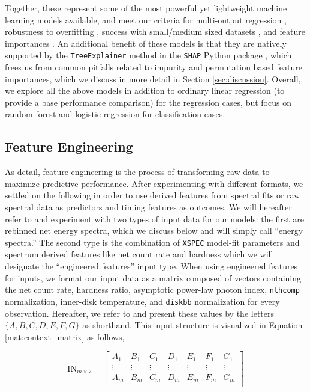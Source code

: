\documentclass[fleqn,usenatbib,twocolumn]{mnras}%
\begin{document}
Together, these represent some of the most powerful yet lightweight machine learning models available, and meet our criteria for multi-output regression \citep{multioutputreview}, robustness to overfitting \citep{metarandomforests,evalTree-BasedEnsembles}, success with small/medium sized datasets \citep{floares2017smallest}, and feature importances \citep{featureimportancestrees}. An additional benefit of these models is that they are natively supported by the \texttt{TreeExplainer} method in the \texttt{SHAP} Python package \citep{SHAP2017}, which frees us from common pitfalls related to impurity and permutation based feature importances, which we discuss in more detail in Section \ref{sec:discussion}. Overall, we explore all the above models in addition to ordinary linear regression (to provide a base performance comparison) for the regression cases, but focus on random forest and logistic regression \citep{original-logistic} for classification cases.  

\subsection{Feature Engineering}\label{sec:feature_engineering}

As \cite{casari2018feature} detail, feature engineering is the process of transforming raw data to maximize predictive performance. After experimenting with different formats, we settled on the following in order to use derived features from spectral fits or raw spectral data as predictors and timing features as outcomes. We will hereafter refer to and experiment with two types of input data for our models: the first are rebinned net energy spectra, which we discuss below and will simply call ``energy spectra.'' The second type is the combination of \texttt{XSPEC} model-fit parameters and spectrum derived features like net count rate and hardness which we will designate the ``engineered features'' input type. When using engineered features for inputs, we format our input data as a matrix composed of vectors containing the net count rate, hardness ratio, asymptotic power-law photon index, \texttt{nthcomp} normalization, inner-disk temperature, and \texttt{diskbb} normalization for every observation. Hereafter, we refer to and present these values by the letters $\{A,B,C,D,E,F,G\}$ as shorthand. This input structure is visualized in Equation \ref{mat:context_matrix} as follows,

\begin{equation}\label{mat:context_matrix}
    \mathrm{IN}_{m\times7} =
    \begin{bmatrix}
    A_1 & B_1 & C_1 & D_1 & E_1 & F_1 & G_1 \\
    \vdots & \vdots & \vdots & \vdots & \vdots & \vdots & \vdots\\
    A_m & B_m & C_m & D_m & E_m & F_m & G_m \\
    \end{bmatrix}
\end{equation}
\end{document}

